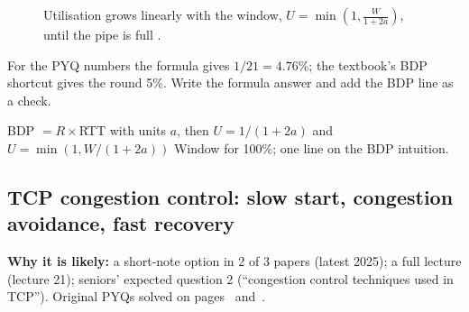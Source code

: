 \begin{figure}[!htbp]\centering
{}
\caption{Utilisation grows linearly with the window, $U=\min\left(1,\frac{W}{1+2a}\right)$, until the pipe is full .}\end{figure}

\begin{examtip}
For the PYQ numbers the formula gives $1/21=4.76\%$; the textbook's BDP shortcut gives the round 5\%. Write the formula answer and add the BDP line as a check.
\end{examtip}
\begin{answerplan}[3 marks]
 BDP $=R\times$RTT with units \quad {} $a$, then $U=1/(1+2a)$ and $U=\min(1,W/(1+2a))$ \quad {} Window for 100\%; one line on the BDP intuition.
\end{answerplan}

\subsection{TCP congestion control: slow start, congestion avoidance, fast recovery}\label{iq:C36}
    

\textbf{Why it is likely:} a short-note option in 2 of 3 papers (latest 2025); a full lecture (lecture 21); seniors' expected question 2 (``congestion control techniques used in TCP''). Original PYQs solved on pages~\pageref{q:MS2025-5iii} and~\pageref{q:MS2022-4c}.

